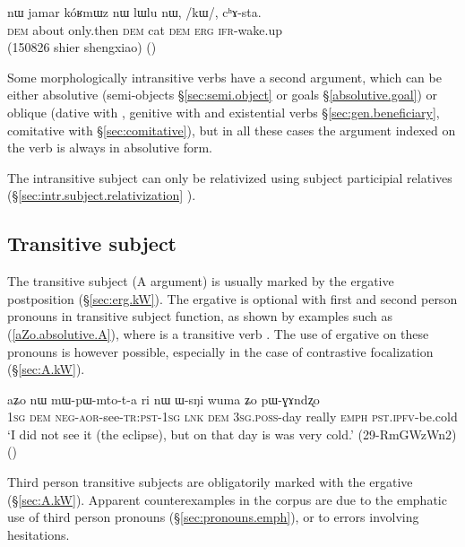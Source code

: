 \begin{exe}
\ex \label{ex:kW.chAsta}
 \gll nɯ jamar kóʁmɯz nɯ lɯlu nɯ, /kɯ/, cʰɤ-sta. \\
 \textsc{dem} about only.then \textsc{dem} cat \textsc{dem} \textsc{erg} \textsc{ifr}-wake.up \\
 \glt (150826 shier shengxiao)
()
\end{exe}

Some morphologically intransitive verbs have a second argument, which can be either absolutive (semi-objects §\ref{sec:semi.object} or goals §\ref{absolutive.goal}) or oblique (dative with , genitive with  and existential verbs §\ref{sec:gen.beneficiary},  comitative with  §\ref{sec:comitative}), but in all these cases the argument indexed on the verb is always in absolutive form. 

The intransitive subject can only be relativized using subject participial relatives (§\ref{sec:intr.subject.relativization} ).

\subsection{Transitive subject} \label{sec:absolutive.A}
The transitive subject (A argument) is usually marked by the ergative postposition  (§\ref{sec:erg.kW}). The ergative is optional with first and second person pronouns in transitive subject function, as shown by examples such as (\ref{aZo.absolutive.A}), where  is a transitive verb . The use of ergative on these pronouns is however possible, especially in the case of contrastive focalization (§\ref{sec:A.kW}).

\begin{exe}
\ex \label{aZo.absolutive.A}
 \gll aʑo nɯ mɯ-pɯ-mto-t-a ri nɯ ɯ-sŋi wuma ʑo pɯ-ɣɤndʐo \\
\textsc{1sg} \textsc{dem} \textsc{neg}-\textsc{aor}-see-\textsc{tr}:\textsc{pst}-\textsc{1sg} \textsc{lnk} \textsc{dem} \textsc{3sg}.\textsc{poss}-day really \textsc{emph} \textsc{pst}.\textsc{ipfv}-be.cold  \\
 \glt `I did not see it (the eclipse), but on that day is was very cold.' (29-RmGWzWn2)
()
\end{exe}

Third person transitive subjects are obligatorily marked with the ergative (§\ref{sec:A.kW}). Apparent counterexamples in the corpus are due to the emphatic use of third person pronouns (§\ref{sec:pronouns.emph}), or to errors involving hesitations.

